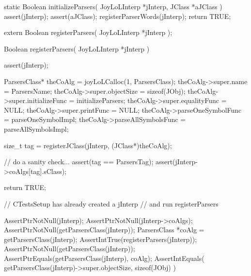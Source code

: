 \startCCode
static Boolean initializeParsers(
  JoyLoLInterp *jInterp,
  JClass   *aJClass
) {
  assert(jInterp);
  assert(aJClass);
  registerParserWords(jInterp);
  return TRUE;
}
\stopCCode

\startCHeader
extern Boolean registerParsers(
  JoyLoLInterp *jInterp
);
\stopCHeader
{}

\startCCode
Boolean registerParsers(
  JoyLoLInterp *jInterp
) {
  assert(jInterp);
  
  ParsersClass* theCoAlg          = joyLoLCalloc(1, ParsersClass);
  theCoAlg->super.name            = ParsersName;
  theCoAlg->super.objectSize      = sizeof(JObj);
  theCoAlg->super.initializeFunc  = initializeParsers;
  theCoAlg->super.equalityFunc    = NULL;
  theCoAlg->super.printFunc       = NULL;
  theCoAlg->parseOneSymbolFunc    = parseOneSymbolImpl;
  theCoAlg->parseAllSymbolsFunc   = parseAllSymbolsImpl;
  
  size_t tag =
    registerJClass(jInterp, (JClass*)theCoAlg);
  
  // do a sanity check...
  assert(tag == ParsersTag);
  assert(jInterp->coAlgs[tag].sClass);
    
  return TRUE;
}
\stopCCode


\startCTest
  // CTestsSetup has already created a jInterp
  // and run registerParsers
  
  AssertPtrNotNull(jInterp);
  AssertPtrNotNull(jInterp->coAlgs);
  AssertPtrNotNull(getParsersClass(jInterp));
  ParsersClass *coAlg = getParsersClass(jInterp);
  AssertIntTrue(registerParsers(jInterp));
  AssertPtrNotNull(getParsersClass(jInterp));
  AssertPtrEquals(getParsersClass(jInterp), coAlg);
  AssertIntEquals(
    getParsersClass(jInterp)->super.objectSize,
    sizeof(JObj)
  )
\stopCTest
\stopTestCase
\stopTestSuite
